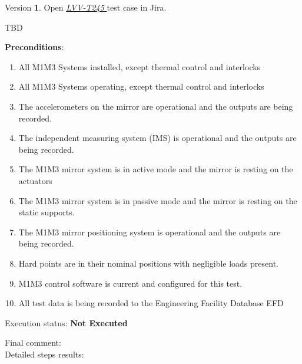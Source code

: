 \documentclass[SE,lsstdraft,STR,toc]{lsstdoc}
\providecommand{\tightlist}{
  \setlength{\itemsep}{0pt}\setlength{\parskip}{0pt}}
\begin{document}
Version \textbf{1}.
Open  \href{https://jira.lsstcorp.org/secure/Tests.jspa#/testCase/LVV-T245}{\textit{ LVV-T245 } }
test case in Jira.

TBD

\textbf{ Preconditions}:\\
\begin{enumerate}
\tightlist
\item
  All M1M3 Systems installed, except thermal control and interlocks
\item
  All M1M3 Systems operating, except thermal control and interlocks
\item
  The accelerometers on the mirror are operational and the outputs are
  being recorded.
\item
  The independent measuring system (IMS) is operational and the outputs
  are being recorded.
\item
  The M1M3 mirror system is in active mode and the mirror is resting on
  the actuators
\item
  The M1M3 mirror system is in passive mode and the mirror is resting on
  the static supports.
\item
  The M1M3 mirror positioning system is operational and the outputs are
  being recorded.
\item
  Hard points are in their nominal positions with negligible loads
  present.
\item
  M1M3 control software is current and configured for this test.
\item
  All test data is being recorded to the Engineering Facility Database
  EFD
\end{enumerate}

Execution status: {\bf Not Executed }

Final comment:\\


Detailed steps results:
\end{document}
